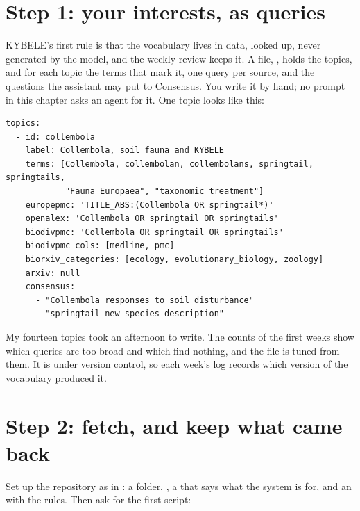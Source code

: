 \section{Step 1: your interests, as queries}

KYBELE's first rule is that the vocabulary lives in data, looked up, never
generated by the model, and the weekly review keeps it. A file,
, holds the topics, and for each topic the terms
that mark it, one query per source, and the questions the assistant may put
to Consensus. You write it by hand; no prompt in this chapter asks an agent
for it. One topic looks like this:

\begin{lstlisting}[caption={One topic in config/interests.yml}]
topics:
  - id: collembola
    label: Collembola, soil fauna and KYBELE
    terms: [Collembola, collembolan, collembolans, springtail, springtails,
            "Fauna Europaea", "taxonomic treatment"]
    europepmc: 'TITLE_ABS:(Collembola OR springtail*)'
    openalex: 'Collembola OR springtail OR springtails'
    biodivpmc: 'Collembola OR springtail OR springtails'
    biodivpmc_cols: [medline, pmc]
    biorxiv_categories: [ecology, evolutionary_biology, zoology]
    arxiv: null
    consensus:
      - "Collembola responses to soil disturbance"
      - "springtail new species description"
\end{lstlisting}

My fourteen topics took an afternoon to write. The counts of the first weeks
show which queries are too broad and which find nothing, and the file is
tuned from them. It is under version control, so each week's log records
which version of the vocabulary produced it.

\section{Step 2: fetch, and keep what came back}

Set up the repository as in : a folder, ,
a  that says what the system is for, and an 
with the rules. Then ask for the first script:

